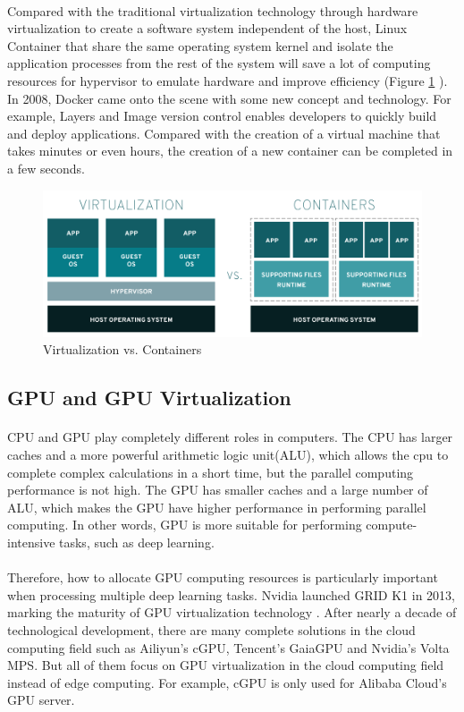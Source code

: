 \documentclass{article}
\begin{document}
            \paragraph{}
            Compared with the traditional virtualization technology through hardware virtualization to create a software system independent of the host, Linux Container that share the same operating system kernel and isolate the application processes from the rest of the system will save a lot of computing resources for hypervisor to emulate hardware and improve efficiency (Figure \ref{img1} \cite{redhat}). In 2008, Docker came onto the scene with some new concept and technology. For example, Layers and Image version control enables developers to quickly build and deploy applications. Compared with the creation of a virtual machine that takes minutes or even hours, the creation of a new container can be completed in a few seconds.
            \begin{figure}[H]
                \centering
                \includegraphics[width=.7\textwidth]{img/report1.png}
                \caption{Virtualization vs. Containers}
                \label{img1} 
            \end{figure}
        \subsection{GPU and GPU Virtualization}
            \paragraph{}
            CPU and GPU play completely different roles in computers. The CPU has  larger caches and a more powerful arithmetic logic unit(ALU), which allows the cpu to complete complex calculations in a short time, but the parallel computing performance is not high. The GPU has smaller caches and a large number of ALU, which makes the GPU have higher performance in performing parallel computing. In other words, GPU is more suitable for performing compute-intensive tasks, such as deep learning.
            \paragraph{}
            Therefore, how to allocate GPU computing resources is particularly important when processing multiple deep learning tasks. Nvidia launched GRID K1 in 2013, marking the maturity of GPU virtualization technology \cite{herrera2014nvidia}. After nearly a decade of technological development, there are many complete solutions in the cloud computing field such as Ailiyun's cGPU, Tencent's GaiaGPU\cite{8672318} and Nvidia's Volta MPS\cite{nvidiamps}. But all of them  focus on GPU virtualization in the cloud computing field instead of edge computing. For example, cGPU is only used for Alibaba Cloud's GPU server.
\end{document}
